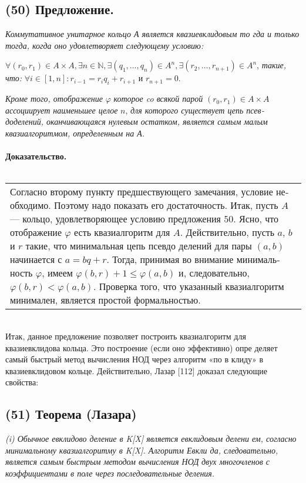 \documentclass{mai_book}
\begin{document}
\subsection*{(50) Предложение.}
\textit{Коммутативное унитарное кольцо А является квазиевклидовым то­
гда и только тогда, когда оно удовлетворяет следующему условию:
}
\begin{center}
 $\forall(r_{0},r_{1})\in A\times A,\exists n\in\mathbb{N},\exists(q_{1},\ldots,q_{n})\in A^n,\exists(r_{2},\ldots,r_{n+1})\in A^n$,\linebreak
\textit{такие, что:} $\forall i\in[1,n] : r_{i-1}=r_{i}q_{i}+r_{i+1}$ и $r_{n+1} = 0$.
\end{center}
\textit{Кроме того, отображение} $\varphi$ \textit{которое co всякой парой} $(r_{0},r_{1})\in A\times A$ \textit{ассоциирует наименьшее целое} $n$, \textit{для которого существует цепь псев­
доделений, оканчивающаяся нулевым остатком, является самым малым
квазиалгоритмом, определенным на А.}
\\\\
\textbf{Доказательство.}
\\\\
\hspace*{15pt}\begin{tabular}{|p{12.5cm}}
Согласно второму пункту предшествующего замечания, условие не­
обходимо. Поэтому надо показать его достаточность. Итак, пусть
$A$ — кольцо, удовлетворяющее условию предложения $50$. Ясно, что
отображение $\varphi$ есть квазиалгоритм для $A$. Действительно, пусть $a$,
$b$ и $r$ такие, что минимальная цепь псевдо делений для пары $(a,b)$
начинается с $a=bq+r$. Тогда, принимая во внимание минималь­
ность $\varphi$, имеем $\varphi(b,r)+1\leqslant\varphi(a,b)$ и, следовательно, $\varphi(b,r) < \varphi(a,b)$.
Проверка того, что указанный квазиалгоритм минимален, является простой формальностью.
\end{tabular}
\\

Итак, данное предложение позволяет построить квазиалгоритм для
квазиевклидова кольца. Это построение (если оно эффективно) опре­
деляет самый быстрый метод вычисления НОД через алгоритм «по в­
клиду» в квазиевклидовом кольце. Действительно, Лазар [112] доказал
следующие свойства:
\subsection*{(51) Теорема (Лазара)}
\textit{(i) Обычное евклидово деление в K[X] является евклидовым делени­
ем, согласно минимальному квазиалгоритму в K[X]. Алгоритм Евкли­
да, следовательно, является самым быстрым методом вычисления НОД}
\textit{двух многочленов с коэффициентами в поле через последовательные
деления.}
\end{document}
